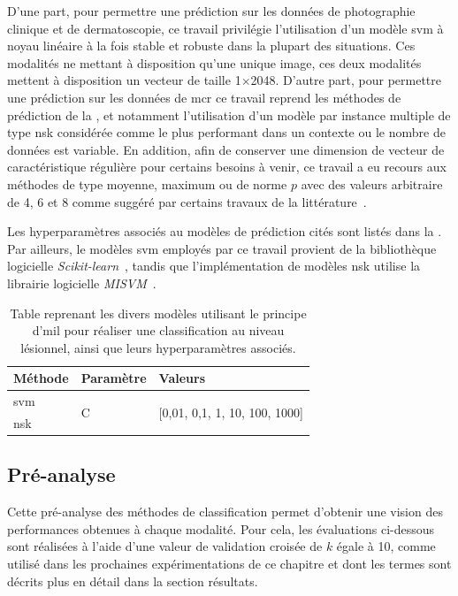 D'une part, pour permettre une prédiction sur les données de photographie clinique et de dermatoscopie, ce travail privilégie l'utilisation d'un modèle \gls{svm} à noyau linéaire à la fois stable et robuste dans la plupart des situations. Ces modalités ne mettant à disposition qu’une unique image, ces deux modalités mettent à disposition un vecteur de taille 1$\times$2048. D'autre part, pour permettre une prédiction sur les données de \gls{mcr} ce travail reprend les méthodes de prédiction de la , et notamment l'utilisation d'un modèle par instance multiple de type \gls{nsk} considérée comme le plus performant dans un contexte ou le nombre de données est variable. En addition, afin de conserver une dimension de vecteur de caractéristique régulière pour certains besoins à venir, ce travail a eu recours aux méthodes de type moyenne, maximum ou de norme $p$ avec des valeurs arbitraire de 4, 6 et 8 comme suggéré par certains travaux de la littérature~\cite{Li2016,Xu2017}.\par

Les hyperparamètres associés au modèles de prédiction cités sont listés dans la . Par ailleurs, le modèles \gls{svm} employés par ce travail provient de la bibliothèque logicielle \textit{Scikit-learn}~\cite{pedregosa2011}, tandis que l'implémentation de modèles \gls{nsk} utilise la librairie logicielle \textit{MISVM}~\cite{Doran2014}.\par
\begin{table}[H]
    \centering
    \begin{tabular}{lll}
    \toprule
    \textbf{Méthode}    & \textbf{Paramètre}& \textbf{Valeurs}                                  \\ \midrule
    \gls{svm}           & \multirow{2}{*}{C}& \multirow{2}{*}{[0,01, 0,1, 1, 10, 100, 1000]}    \\ \cline{1-1}
    \gls{nsk}           &                   &                                                   \\ \bottomrule 
    \end{tabular}    
    \caption{Table reprenant les divers modèles utilisant le principe d'\gls{mil} pour réaliser une classification au niveau lésionnel, ainsi que leurs hyperparamètres associés.}
    \label{tab:multimodal_models_parameters}
\end{table}\par
\clearpage

\subsection{Pré-analyse}
Cette pré-analyse des méthodes de classification permet d'obtenir une vision des performances obtenues à chaque modalité. Pour cela, les évaluations ci-dessous sont réalisées à l'aide d'une valeur de validation croisée de $k$ égale à 10, comme utilisé dans les prochaines expérimentations de ce chapitre et dont les termes sont décrits plus en détail dans la section résultats.\par

